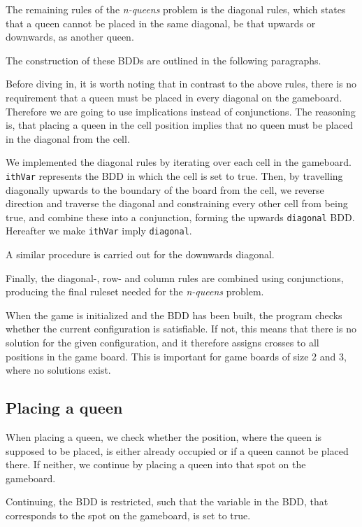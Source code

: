 \newpar The remaining rules of the \textit{n-queens} problem is the diagonal rules, which states that a queen cannot be placed in the same diagonal, be that upwards or downwards, as another queen.

\newpar The construction of these BDDs are outlined in the following paragraphs.

\newpar
Before diving in, it is worth noting that in contrast to the above rules, there is no requirement that a queen must be placed in every diagonal on the gameboard. Therefore we are going to use implications instead of conjunctions. The reasoning is, that placing a queen in the cell position implies that no queen must be placed in the diagonal from the cell.

\newpar 
We implemented the diagonal rules by iterating over each cell in the gameboard. \texttt{ithVar} represents the BDD in which the cell is set to true. Then, by travelling diagonally upwards to the boundary of the board from the cell, we reverse direction and traverse the diagonal and constraining every other cell from being true, and combine these into a conjunction, forming the upwards \texttt{diagonal} BDD. Hereafter we make \texttt{ithVar} imply \texttt{diagonal}.

\newpar
A similar procedure is carried out for the downwards diagonal.

\newpar Finally, the diagonal-, row- and column rules are combined using conjunctions, producing the final ruleset needed for the \textit{n-queens} problem.

\newpar When the game is initialized and the BDD has been built, the program checks whether the current configuration is satisfiable. If not, this means that there is no solution for the given configuration, and it therefore assigns crosses to all positions in the game board. This is important for game boards of size 2 and 3, where no solutions exist.

\subsection{Placing a queen}
When placing a queen, we check whether the position, where the queen is supposed to be placed, is either already occupied or if a queen cannot be placed there. If neither, we continue by placing a queen into that spot on the gameboard.

\newpar Continuing, the BDD is restricted, such that the variable in the BDD, that corresponds to the spot on the gameboard, is set to true. 

